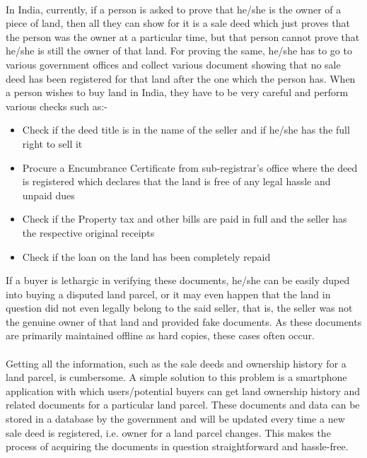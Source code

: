 \documentclass[12pt]{article}
\begin{document}
        \paragraph{}
        In India, currently, if a person is asked to prove that he/she is the owner of a piece of land, then all they can show for it is a sale deed which just proves that the person was the owner at a particular time, but that person cannot prove that he/she is still the owner of that land. For proving the same, he/she has to go to various government offices and collect various document showing that no sale deed has been registered for that land after the one which the person has. When a person wishes to buy land in India, they have to be very careful and perform various checks such as:-
        \begin{itemize}
            \item Check if the deed title is in the name of the seller and if he/she has the full right to sell it
            \item Procure a Encumbrance Certificate from sub-registrar's office where the deed is registered which declares that the land is free of any legal hassle and unpaid dues
            \item Check if the Property tax and other bills are paid in full and the seller has the respective original receipts
            \item Check if the loan on the land has been completely repaid
        \end{itemize}
        If a buyer is lethargic in verifying these documents, he/she can be easily duped into buying a disputed land parcel, or it may even happen that the land in question did not even legally belong to the said seller, that is, the seller was not the genuine owner of that land and provided fake documents. As these documents are primarily maintained offline as hard copies, these cases often occur.

        \paragraph{}
        Getting all the information, such as the sale deeds and ownership history for a land parcel, is cumbersome. A simple solution to this problem is a smartphone application with which users/potential buyers can get land ownership history and related documents for a particular land parcel. These documents and data can be stored in a database by the government and will be updated every time a new sale deed is registered, i.e. owner for a land parcel changes. This makes the process of acquiring the documents in question straightforward and hassle-free.
\end{document}

